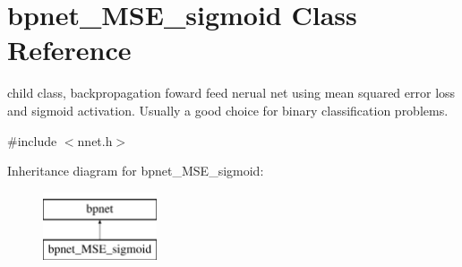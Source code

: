 \hypertarget{classbpnet__MSE__sigmoid}{\section{bpnet\-\_\-\-M\-S\-E\-\_\-sigmoid Class Reference}
\label{classbpnet__MSE__sigmoid}
}


child class, backpropagation foward feed nerual net using mean squared error loss and sigmoid activation. Usually a good choice for binary classification problems.  




{\ttfamily \#include $<$nnet.\-h$>$}

Inheritance diagram for bpnet\-\_\-\-M\-S\-E\-\_\-sigmoid\-:\begin{figure}[H]
\begin{center}
\leavevmode
\includegraphics[height=2.000000cm]{classbpnet__MSE__sigmoid}
\end{center}
\end{figure}
